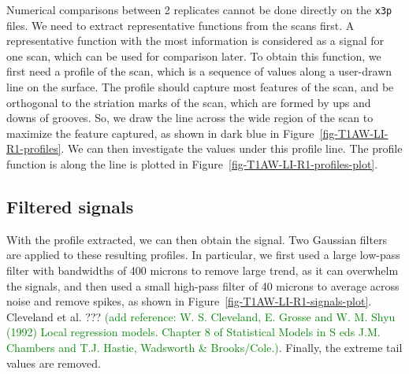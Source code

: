 \documentclass[fleqn,10pt]{wlscirep}
\newcommand{\tom}[1]{{\textcolor{RedOrange}{#1}}}
\newcommand{\hh}[1]{{\textcolor{Green}{#1}}}
\begin{document}
Numerical comparisons between 2 replicates cannot be done directly on
the \texttt{x3p} files. We need to extract representative functions from
the scans first. A representative function with the most information is
considered as a signal for one scan, which can be used for comparison
later. To obtain this function, we first need a profile of the scan,
which is a sequence of values along a user-drawn line on the surface.
The profile should capture most features of the scan, and be orthogonal
to the striation marks of the scan, which are formed by ups and downs of
grooves. So, we draw the line across the wide region of the scan to
maximize the feature captured, as shown in dark blue in
Figure~\ref{fig-T1AW-LI-R1-profiles}. We can then investigate the values
under this profile line. The profile function is along the line is
plotted in Figure~\ref{fig-T1AW-LI-R1-profiles-plot}.

\subsection*{Filtered signals}\label{sec-filtered-signals}

With the profile extracted, we can then obtain the signal. Two Gaussian
filters are applied to these resulting profiles. In particular, we first
used a large low-pass filter with bandwidths of 400 microns to remove
large trend, as it can overwhelm the signals, and then used a small
high-pass filter of 40 microns to average across noise and remove
spikes, as shown in Figure~\ref{fig-T1AW-LI-R1-signals-plot}. Cleveland
et al. \citep{clevelandLocalRegressionModels1992}\tom{???}
\hh{(add reference: W. S. Cleveland, E. Grosse and W. M. Shyu (1992) Local regression models. Chapter 8 of Statistical Models in S eds J.M. Chambers and T.J. Hastie, Wadsworth \& Brooks/Cole.)}.
Finally, the extreme tail values are removed.
\end{document}
